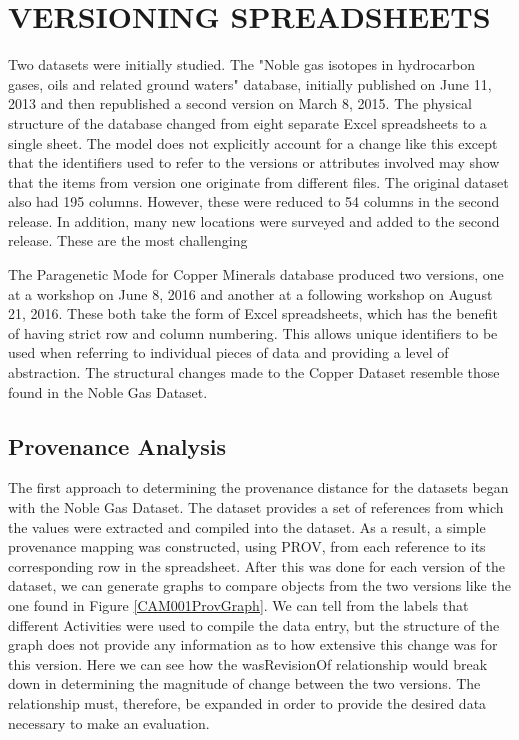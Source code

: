 
\chapter{VERSIONING SPREADSHEETS}

Two datasets were initially studied.  The "Noble gas isotopes in hydrocarbon gases, oils and related ground waters" database, initially published on June 11, 2013 and then republished a second version on March 8, 2015.  The physical structure of the database changed from eight separate Excel spreadsheets to a single sheet.  The model does not explicitly account for a change like this except that the identifiers used to refer to the versions or attributes involved may show that the items from version one originate from different files.  The original dataset also had 195 columns.  However, these were reduced to 54 columns in the second release.  In addition, many new locations were surveyed and added to the second release.  These are the most challenging 

The Paragenetic Mode for Copper Minerals database produced two versions, one at a workshop on June 8, 2016 and another at a following workshop on August 21, 2016.  These both take the form of Excel spreadsheets, which has the benefit of having strict row and column numbering. This allows unique identifiers to be used when referring to individual pieces of data and providing a level of abstraction.  The structural changes made to the Copper Dataset resemble those found in the Noble Gas Dataset.

\section{Provenance Analysis}

The first approach to determining the provenance distance for the datasets began with the Noble Gas Dataset.  The dataset provides a set of references from which the values were extracted and compiled into the dataset.  As a result, a simple provenance mapping was constructed, using PROV, from each reference to its corresponding row in the spreadsheet.  After this was done for each version of the dataset, we can generate graphs to compare objects from the two versions like the one found in Figure \ref{CAM001ProvGraph}.  We can tell from the labels that different Activities were used to compile the data entry, but the structure of the graph does not provide any information as to how extensive this change was for this version.  Here we can see how the wasRevisionOf relationship would break down in determining the magnitude of change between the two versions.  The relationship must, therefore, be expanded in order to provide the desired data necessary to make an evaluation.

